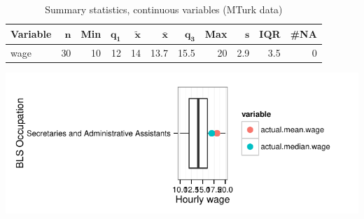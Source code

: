 \documentclass[a4paper,10pt]{article}\usepackage[]{graphicx}\usepackage[]{color}
\makeatletter
\def\maxwidth{ %
  \ifdim\Gin@nat@width>\linewidth
    \linewidth
  \else
    \Gin@nat@width
  \fi
}
\makeatother
\begin{document}
\begin{table}[ht]
\centering
{\footnotesize
\begin{tabular}{lrrrrrrrrrr}
 \textbf{Variable} & $\mathbf{n}$ & \textbf{Min} & $\mathbf{q_1}$ & $\mathbf{\widetilde{x}}$ & $\mathbf{\bar{x}}$ & $\mathbf{q_3}$ & \textbf{Max} & $\mathbf{s}$ & \textbf{IQR} & \textbf{\#NA} \\ 
  \hline
wage & 30 & 10 & 12 & 14 & 13.7 & 15.5 & 20 & 2.9 & 3.5 & 0 \\ 
  \end{tabular}
}
\caption{Summary statistics, continuous variables (MTurk data)} 
\label{tab2:43-6010}
\end{table}


{\centering \includegraphics[width=\maxwidth]{figure/unnamed-chunk-22} 

}
\end{document}
